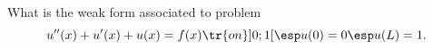 \bexo
What is the weak form associated to problem
\begin{equation}
	u''(x)+u'(x)+u(x)=f(x) \tr{ on } ]0;1[\esp u(0)=0 \esp u(L)=1. 
\end{equation}

\eexo

